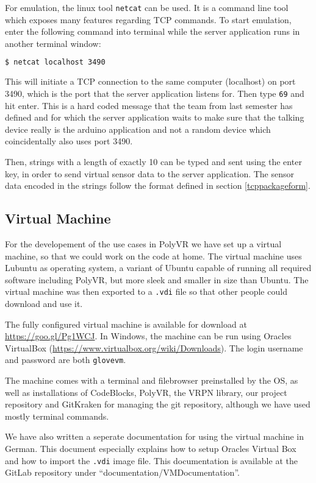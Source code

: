 For emulation, the linux tool \texttt{netcat} can be used. It is a command line tool which exposes many features regarding TCP commands. To start emulation, enter the following command into terminal while the server application runs in another terminal window:

\begin{lstlisting}[language=bash]
$ netcat localhost 3490
\end{lstlisting}

This will initiate a TCP connection to the same computer (localhost) on port 3490, which is the port that the server application listens for. Then type \texttt{69} and hit enter. This is a hard coded message that the team from last semester has defined and for which the server application waits to make sure that the talking device really is the arduino application and not a random device which coincidentally also uses port 3490.

Then, strings with a length of exactly 10 can be typed and sent using the enter key, in order to send virtual sensor data to the server application. The sensor data encoded in the strings follow the format defined in section \ref{tcppackageform}.

\subsection{Virtual Machine}

For the developement of the use cases in PolyVR we have set up a virtual machine, so that we could work on the code at home. The virtual machine uses Lubuntu as operating system, a variant of Ubuntu capable of running all required software including PolyVR, but more sleek and smaller in size than Ubuntu. The virtual machine was then exported to a \texttt{.vdi} file so that other people could download and use it.

The fully configured virtual machine is available for download at \url{https://goo.gl/Pg1WCJ}. In Windows, the machine can be run using Oracles VirtualBox (\url{https://www.virtualbox.org/wiki/Downloads}). The login username and password are both \texttt{glovevm}.

The machine comes with a terminal and filebrowser preinstalled by the OS, as well as installations of CodeBlocks, PolyVR, the VRPN library, our project repository and GitKraken for managing the git repository, although we have used mostly terminal commands.

We have also written a seperate documentation for using the virtual machine in German. This document especially explains how to setup Oracles Virtual Box and how to import the \texttt{.vdi} image file. This documentation is available at the GitLab repository under ``documentation/VMDocumentation''.

